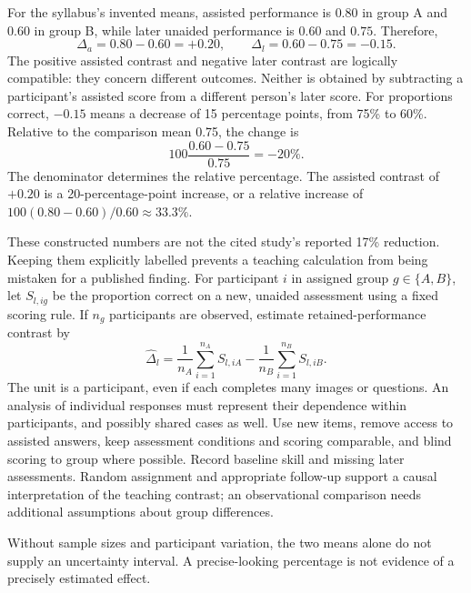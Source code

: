 For the syllabus's invented means, assisted performance is $0.80$ in group A and $0.60$ in group B, while later unaided performance is $0.60$ and $0.75$. Therefore,
\[
\Delta_a=0.80-0.60=+0.20,\qquad
\Delta_l=0.60-0.75=-0.15.
\]
The positive assisted contrast and negative later contrast are logically compatible: they concern different outcomes. Neither is obtained by subtracting a participant's assisted score from a different person's later score.
For proportions correct, $-0.15$ means a decrease of 15 percentage points, from 75\% to 60\%. Relative to the comparison mean 0.75, the change is
\[
100\frac{0.60-0.75}{0.75}=-20\%.
\]
The denominator determines the relative percentage. The assisted contrast of $+0.20$ is a 20-percentage-point increase, or a relative increase of $100(0.80-0.60)/0.60\approx33.3\%$.

These constructed numbers are not the cited study's reported 17\% reduction. Keeping them explicitly labelled prevents a teaching calculation from being mistaken for a published finding.
For participant $i$ in assigned group $g\in\{A,B\}$, let $S_{l,ig}$ be the proportion correct on a new, unaided assessment using a fixed scoring rule. If $n_g$ participants are observed, estimate retained-performance contrast by
\[
\widehat\Delta_l=
\frac1{n_A}\sum_{i=1}^{n_A}S_{l,iA}
-\frac1{n_B}\sum_{i=1}^{n_B}S_{l,iB}.
\]
The unit is a participant, even if each completes many images or questions. An analysis of individual responses must represent their dependence within participants, and possibly shared cases as well.
Use new items, remove access to assisted answers, keep assessment conditions and scoring comparable, and blind scoring to group where possible. Record baseline skill and missing later assessments. Random assignment and appropriate follow-up support a causal interpretation of the teaching contrast; an observational comparison needs additional assumptions about group differences.

Without sample sizes and participant variation, the two means alone do not supply an uncertainty interval. A precise-looking percentage is not evidence of a precisely estimated effect.

